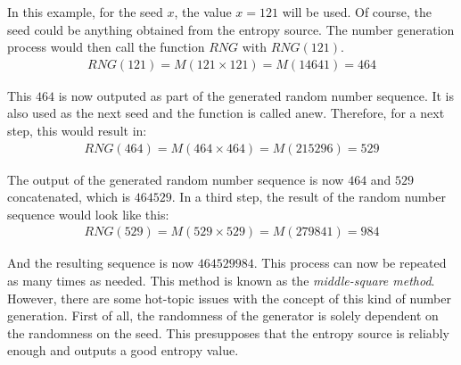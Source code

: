 \noindent
In this example, for the seed $x$, the value $x = 121$ will be used. Of course, the seed could be anything obtained from the entropy source.
The number generation process would then call the function $RNG$ with $RNG(121)$.
$$
\begin{array}{l}
    RNG(121) = M \left(121 \times 121\right) = M(14641) = 464
\end{array}
$$

\noindent
This $464$ is now outputed as part of the generated random number sequence. It is also used as the next seed and the function is called anew.
Therefore, for a next step, this would result in:
$$
\begin{array}{l}
    RNG(464) = M \left(464 \times 464\right) = M(215296) = 529
\end{array}
$$

\noindent
The output of the generated random number sequence is now $464$ and $529$ concatenated, which is $464529$.
In a third step, the result of the random number sequence would look like this:
$$
\begin{array}{l}
    RNG(529) = M \left(529 \times 529\right) = M(279841) = 984
\end{array}
$$

\noindent
And the resulting sequence is now $464529984$. This process can now be repeated as many times as needed. This method is known as the \emph{middle-square method}.
However, there are some hot-topic issues with the concept of this kind of number generation. First of all, the randomness of the generator is solely dependent on the randomness on the seed.
This presupposes that the entropy source is reliably enough and outputs a good entropy value.

